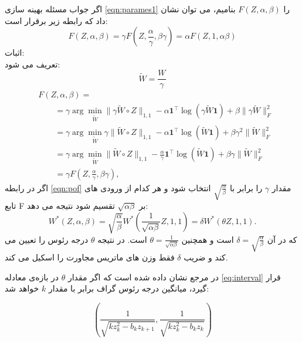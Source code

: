 \documentclass[10pt,twocolumn,a4paper]{article}
\begin{document}
	اگر جواب مسئله بهینه سازی 
	\ref{eqn:parames1}
	 را 
	 $F(Z,\alpha,\beta)$
	 بنامیم، می توان نشان داد که رابطه زیر برقرار است:
	 \begin{equation}
	 	F(Z,\alpha,\beta) = \gamma F(Z,\frac{\alpha}{\gamma}
,\beta \gamma) = \alpha F(Z,1,\alpha \beta)
	 \end{equation}
	 اثبات:\\
	 تعریف می شود:\\
	 \begin{equation}
	 	\tilde{W} = \frac{W}{\gamma}
	 \end{equation}
	 \begin{equation}\label{eqn:pof}
	 	\begin{array}{cl}
	 		&F(Z, \alpha, \beta) =\\
	 		&\qquad= \gamma \arg\min_{\tilde{W}} \|\gamma \tilde{W} \circ Z\|_{1,1} - \alpha \mathbf{1}^\top \log(\gamma \tilde{W} \mathbf{1}) + \beta \|\gamma \tilde{W}\|_F^2\\
	 		&\qquad = \gamma \arg\min_{\tilde{W}} \gamma \|\tilde{W} \circ Z\|_{1,1} - \alpha \mathbf{1}^\top \log(\tilde{W} \mathbf{1}) + \beta \gamma^2 \|\tilde{W}\|_F^2\\
	 		&\qquad = \gamma \arg\min_{\tilde{W}} \|\tilde{W} \circ Z\|_{1,1} - \frac{\alpha}{\gamma} \mathbf{1}^\top \log(\tilde{W} \mathbf{1}) + \beta \gamma \|\tilde{W}\|_F^2\\
	 		&\qquad = \gamma F \left( Z, \frac{\alpha}{\gamma}, \beta \gamma \right),
	 	\end{array}
	 \end{equation}
	 اگر در رابطه
	  \ref{eqn:pof}
	  مقدار 
	  $\gamma$
	  را برابر با 
	  $\sqrt{\frac{\alpha}{\beta}}$
	  انتخاب شود و هر کدام از ورودی های تابع F بر 
	  $\sqrt{\alpha \beta}$
	  تقسیم شود نتیجه می دهد:
	  \begin{equation}
	  	W^*(Z, \alpha, \beta) = \sqrt{\frac{\alpha}{\beta}} W^* \left( \frac{1}{\sqrt{\alpha \beta}} Z, 1, 1 \right) = \delta W^* (\theta Z, 1, 1).
	  \end{equation}
	  که در آن
	  $\delta=\sqrt{\frac{\alpha}{\beta}}$
	 است و همچنین 
	 $\theta = \frac{1}{\sqrt{\alpha \beta}}$
	 است. 
	  در نتیجه $\theta$ درجه رئوس را تعیین می کند و ضریب $\delta$ فقط وزن های ماتریس مجاورت را اسکیل می کند.
	 
	
	در مرجع نشان داده شده است که اگر مقدار \( \theta \) در بازه‌ی معادله
	\ref{eq:interval}
	قرار گیرد، میانگین درجه رئوس گراف برابر با مقدار \( k \) خواهد شد:
	
	\begin{equation} \label{eq:interval}
		\left( \frac{1}{\sqrt{k z_k^2 - b_k z_{k+1}}}, \frac{1}{\sqrt{k z_k^2 - b_k z_k}} \right)
	\end{equation}
	
\end{document}
